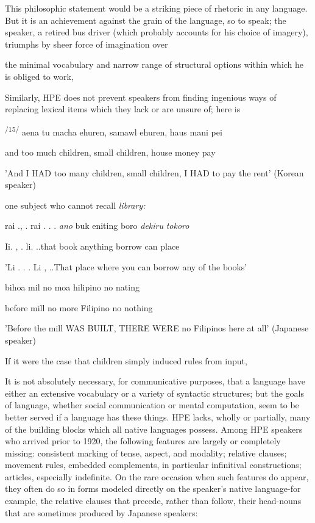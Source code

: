 This philosophic statement would be a striking piece of rhetoric in any language. But it is an achievement against the grain of the language, so to speak; the speaker, a retired bus driver (which probably accounts for his choice of imagery), triumphs by sheer force of imagination over


the minimal vocabulary and narrow range of structural options within which he is obliged to work,

Similarly, HPE does not prevent speakers from finding ingenious ways of replacing lexical items which they lack or are unsure of; here is


\textsuperscript{/15/} aena tu macha ehuren, samawl ehuren, haus mani pei

and too much children, small children, house money pay

'And I HAD too many children, small children, I HAD to pay the rent' (Korean speaker)

one subject who cannot recall \textit{library:}

\ea\label{ex:13}
 rai ., . rai . . . \textit{ano} buk eniting boro \textit{dekiru} \textit{tokoro}
\glt
\z

Ii. , . li. ..that book anything borrow can place

'Li . . . Li , ..That place where you can borrow any of the books'

\ea\label{ex:16}

\glt
\z

bihoa mil no moa hilipino no nating

before mill no more Filipino no nothing

'Before the mill WAS BUILT, THERE WERE no Filipinos here at all' (Japanese speaker)

If it were the case that children simply induced rules from input,

It is not absolutely necessary, for communicative purposes, that a language have either an extensive vocabulary or a variety of syntactic structures; but the goals of language, whether social communication or mental computation, seem to be better served if a language has these things. HPE lacks, wholly or partially, many of the building blocks which all native languages possess. Among HPE speakers who arrived prior to 1920, the following features are largely or completely missing: consistent marking of tense, aspect, and modality; relative clauses; movement rules, embedded complements, in particular infinitival con\-structions; articles, especially indefinite. On the rare occasion when such features do appear, they often do so in forms modeled directly on the speaker's native language{}-for example, the relative clauses that precede, rather than follow, their head-nouns that are sometimes produced by Japanese speakers:

